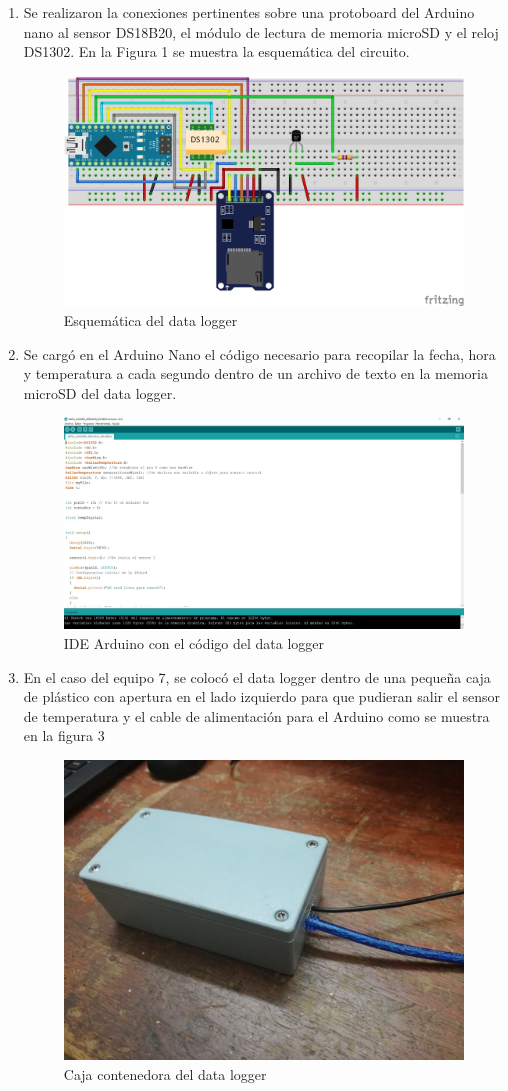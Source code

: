 \documentclass[11pt,twocolumn,letterpaper,spanish]{article}
\begin{document}
\begin{enumerate}
\item Se realizaron la conexiones pertinentes sobre una protoboard del Arduino nano al sensor DS18B20, el módulo de lectura de memoria microSD y el reloj DS1302. En la Figura 1 se muestra la esquemática del circuito.

\begin{figure}[h!]
   \centering
   \includegraphics[width = 6.5 cm,height = 4 cm]{Imagenes/esquema}
   \caption{Esquemática del data logger}
\end{figure}


\item Se cargó en el Arduino Nano el código necesario para recopilar la fecha, hora y temperatura a cada segundo dentro de un archivo de texto en la memoria microSD del data logger.

\begin{figure}[h!]
   \centering
   \includegraphics[width = 7 cm, height = 5 cm]{Imagenes/arduinoide}
   \caption{IDE Arduino con el código del data logger}
\end{figure}

\item En el caso del equipo 7, se colocó el data logger dentro de una pequeña caja de plástico con apertura en el lado izquierdo para que pudieran salir el sensor de temperatura y el cable de alimentación para el Arduino como se muestra en la figura 3

\begin{figure}[h!]
   \centering
   \includegraphics[width = 6 cm]{Imagenes/cajita}
   \caption{Caja contenedora del data logger}
\end{figure}


\end{enumerate}
\end{document}
